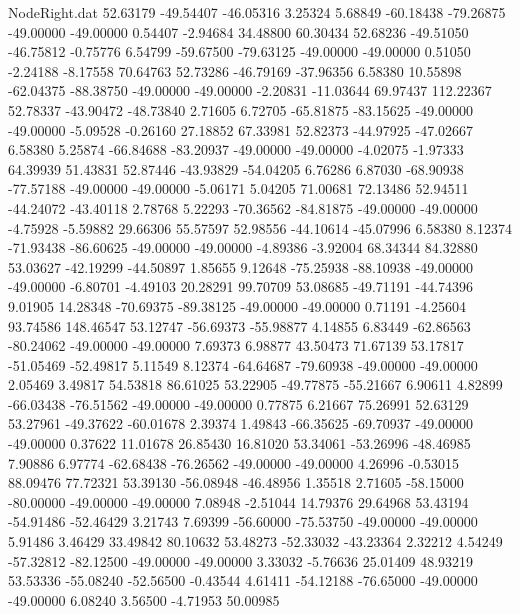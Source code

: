 \begin{filecontents}{NodeRight.dat}
  52.63179  -49.54407  -46.05316     3.25324    5.68849  -60.18438  -79.26875  -49.00000  -49.00000    0.54407   -2.94684   34.48800   60.30434
  52.68236  -49.51050  -46.75812    -0.75776    6.54799  -59.67500  -79.63125  -49.00000  -49.00000    0.51050   -2.24188   -8.17558   70.64763
  52.73286  -46.79169  -37.96356     6.58380   10.55898  -62.04375  -88.38750  -49.00000  -49.00000   -2.20831  -11.03644   69.97437  112.22367
  52.78337  -43.90472  -48.73840     2.71605    6.72705  -65.81875  -83.15625  -49.00000  -49.00000   -5.09528   -0.26160   27.18852   67.33981
  52.82373  -44.97925  -47.02667     6.58380    5.25874  -66.84688  -83.20937  -49.00000  -49.00000   -4.02075   -1.97333   64.39939   51.43831
  52.87446  -43.93829  -54.04205     6.76286    6.87030  -68.90938  -77.57188  -49.00000  -49.00000   -5.06171    5.04205   71.00681   72.13486
  52.94511  -44.24072  -43.40118     2.78768    5.22293  -70.36562  -84.81875  -49.00000  -49.00000   -4.75928   -5.59882   29.66306   55.57597
  52.98556  -44.10614  -45.07996     6.58380    8.12374  -71.93438  -86.60625  -49.00000  -49.00000   -4.89386   -3.92004   68.34344   84.32880
  53.03627  -42.19299  -44.50897     1.85655    9.12648  -75.25938  -88.10938  -49.00000  -49.00000   -6.80701   -4.49103   20.28291   99.70709
  53.08685  -49.71191  -44.74396     9.01905   14.28348  -70.69375  -89.38125  -49.00000  -49.00000    0.71191   -4.25604   93.74586  148.46547
  53.12747  -56.69373  -55.98877     4.14855    6.83449  -62.86563  -80.24062  -49.00000  -49.00000    7.69373    6.98877   43.50473   71.67139
  53.17817  -51.05469  -52.49817     5.11549    8.12374  -64.64687  -79.60938  -49.00000  -49.00000    2.05469    3.49817   54.53818   86.61025
  53.22905  -49.77875  -55.21667     6.90611    4.82899  -66.03438  -76.51562  -49.00000  -49.00000    0.77875    6.21667   75.26991   52.63129
  53.27961  -49.37622  -60.01678     2.39374    1.49843  -66.35625  -69.70937  -49.00000  -49.00000    0.37622   11.01678   26.85430   16.81020
  53.34061  -53.26996  -48.46985     7.90886    6.97774  -62.68438  -76.26562  -49.00000  -49.00000    4.26996   -0.53015   88.09476   77.72321
  53.39130  -56.08948  -46.48956     1.35518    2.71605  -58.15000  -80.00000  -49.00000  -49.00000    7.08948   -2.51044   14.79376   29.64968
  53.43194  -54.91486  -52.46429     3.21743    7.69399  -56.60000  -75.53750  -49.00000  -49.00000    5.91486    3.46429   33.49842   80.10632
  53.48273  -52.33032  -43.23364     2.32212    4.54249  -57.32812  -82.12500  -49.00000  -49.00000    3.33032   -5.76636   25.01409   48.93219
  53.53336  -55.08240  -52.56500    -0.43544    4.61411  -54.12188  -76.65000  -49.00000  -49.00000    6.08240    3.56500   -4.71953   50.00985

\end{filecontents}
